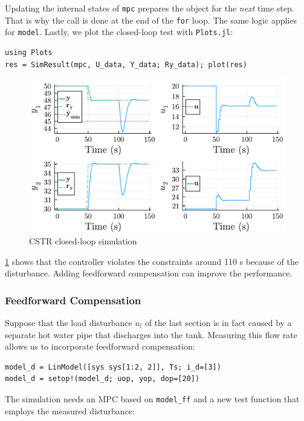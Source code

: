Updating the internal states of \texttt{mpc} prepares the object for the \emph{next} time step. That is why the call is done at the end of the \texttt{for} loop. The same logic applies for \texttt{model}. Lastly, we plot the closed-loop test with \texttt{Plots.jl}:

\begin{verbatim}
using Plots
res = SimResult(mpc, U_data, Y_data; Ry_data); plot(res)
\end{verbatim}

\begin{figure}
    \centering
    \includegraphics[width=\columnwidth]{fig/plot1_LinMPC.pdf}
    \caption{CSTR closed-loop simulation}
    \label{fig:plot1_LinMPC}
\end{figure}

\cref{fig:plot1_LinMPC} shows that the controller violates the constraints around 110 s because of the disturbance. Adding feedforward compensation can improve the performance.

\subsubsection{Feedforward Compensation}

Suppose that the load disturbance $u_l$ of the last section is in fact caused by a separate hot water pipe that discharges into the tank. Measuring this flow rate allows us to incorporate feedforward compensation:

\begin{verbatim}
model_d = LinModel([sys sys[1:2, 2]], Ts; i_d=[3])
model_d = setop!(model_d; uop, yop, dop=[20])
\end{verbatim}

The simulation needs an MPC based on \texttt{model\_ff} and a new test function that employs the measured disturbance:

